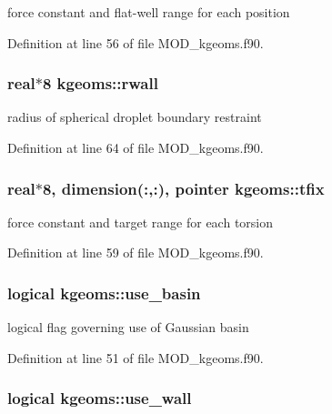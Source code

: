 force constant and flat-\/well range for each position 



Definition at line 56 of file M\-O\-D\-\_\-kgeoms.\-f90.

\hypertarget{classkgeoms_a8476e0216eae03be2043d5cbd501a27a}{
\subsubsection[{rwall}]{\setlength{\rightskip}{0pt plus 5cm}real$\ast$8 kgeoms\-::rwall}}\label{classkgeoms_a8476e0216eae03be2043d5cbd501a27a}


radius of spherical droplet boundary restraint 



Definition at line 64 of file M\-O\-D\-\_\-kgeoms.\-f90.

\hypertarget{classkgeoms_ab092f71a62d6b06032a5972815c2fb23}{
\subsubsection[{tfix}]{\setlength{\rightskip}{0pt plus 5cm}real$\ast$8, dimension(\-:,\-:), pointer kgeoms\-::tfix}}\label{classkgeoms_ab092f71a62d6b06032a5972815c2fb23}


force constant and target range for each torsion 



Definition at line 59 of file M\-O\-D\-\_\-kgeoms.\-f90.

\hypertarget{classkgeoms_ade849736c4d12c61898d6e980cd2667b}{
\subsubsection[{use\-\_\-basin}]{\setlength{\rightskip}{0pt plus 5cm}logical kgeoms\-::use\-\_\-basin}}\label{classkgeoms_ade849736c4d12c61898d6e980cd2667b}


logical flag governing use of Gaussian basin 



Definition at line 51 of file M\-O\-D\-\_\-kgeoms.\-f90.

\hypertarget{classkgeoms_a44ab98c19cba41193f3bba32bce1476b}{
\subsubsection[{use\-\_\-wall}]{\setlength{\rightskip}{0pt plus 5cm}logical kgeoms\-::use\-\_\-wall}}\label{classkgeoms_a44ab98c19cba41193f3bba32bce1476b}


